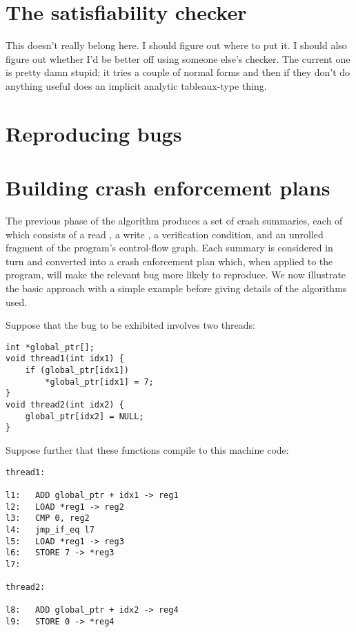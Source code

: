 

\section{The satisfiability checker}
This doesn't really belong here.  I should figure out where to put it.
I should also figure out whether I'd be better off using someone
else's checker.  The current one is pretty damn stupid; it tries a
couple of normal forms and then if they don't do anything useful does
an implicit analytic tableaux-type thing.

\section{Reproducing bugs}

\section{Building crash enforcement plans}

The previous phase of the algorithm produces a set of crash summaries, each of which consists of a read \StateMachine, a write \StateMachine, a verification condition, and an unrolled fragment of the program's control-flow graph.
Each summary is considered in turn and converted into a crash enforcement plan which, when applied to the program, will make the relevant bug more likely to reproduce.
We now illustrate the basic approach with a simple example before giving details of the algorithms used.

Suppose that the bug to be exhibited involves two threads:

\begin{verbatim}
int *global_ptr[];
void thread1(int idx1) {
    if (global_ptr[idx1])
        *global_ptr[idx1] = 7;
} 
void thread2(int idx2) {
    global_ptr[idx2] = NULL;
}
\end{verbatim}

Suppose further that these functions compile to this machine code:

\begin{verbatim}
thread1:

l1:   ADD global_ptr + idx1 -> reg1
l2:   LOAD *reg1 -> reg2
l3:   CMP 0, reg2
l4:   jmp_if_eq l7
l5:   LOAD *reg1 -> reg3
l6:   STORE 7 -> *reg3
l7:

thread2:

l8:   ADD global_ptr + idx2 -> reg4
l9:   STORE 0 -> *reg4
\end{verbatim}


